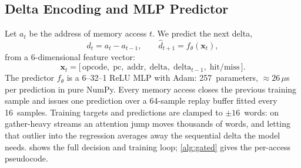 \documentclass[sigplan,anonymous,review,nonacm]{acmart}
\begin{document}
\subsection{Delta Encoding and MLP Predictor}
\label{sec:predictor}

Let $a_t$ be the address of memory access $t$. We predict the next delta,
\begin{equation}
d_t = a_t - a_{t-1}, \qquad \hat{d}_{t+1} = f_\theta(\mathbf{x}_t),
\end{equation}
from a 6-dimensional feature vector:
\begin{equation}
\mathbf{x}_t = \bigl[\,\text{opcode},\;\text{pc},\;\text{addr},\;\text{delta},\;\text{delta}_{t-1},\;\text{hit/miss}\,\bigr].
\end{equation}
The predictor $f_\theta$ is a 6--32--1 ReLU MLP with Adam: 257~parameters,
${\approx}26\,\mu$s per prediction in pure NumPy. Every memory access closes
the previous training sample and issues one prediction over a 64-sample
replay buffer fitted every 16~samples. Training targets and predictions are
clamped to ${\pm}16$~words: on gather-heavy streams an attention jump moves
thousands of words, and letting that outlier into the regression averages
away the sequential delta the model needs.  shows the
full decision and training loop; \cref{alg:gated} gives the per-access
pseudocode.
\end{document}
